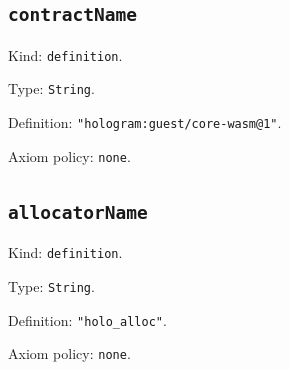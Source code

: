 \documentclass[11pt]{article}
\begin{document}
\subsection*{\texttt{contractName}}
\noindent Kind: \texttt{definition}.\par
\noindent Type: \texttt{String}.\par
\noindent Definition: \texttt{"hologram:guest/core-wasm@1"}.\par
\noindent Axiom policy: \texttt{none}.\par
\subsection*{\texttt{allocatorName}}
\noindent Kind: \texttt{definition}.\par
\noindent Type: \texttt{String}.\par
\noindent Definition: \texttt{"holo\_alloc"}.\par
\noindent Axiom policy: \texttt{none}.\par
\end{document}
